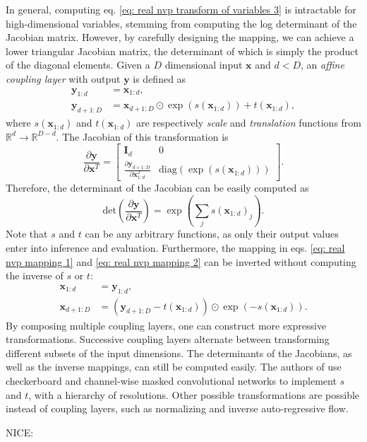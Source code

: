 In general, computing eq. \ref{eq: real nvp transform of variables 3} is intractable for high-dimensional variables, stemming from computing the log determinant of the Jacobian matrix. However, by carefully designing the mapping, we can achieve a lower triangular Jacobian matrix, the determinant of which is simply the product of the diagonal elements. Given a $D$ dimensional input $\mathbf{x}$ and $d < D$, an \textit{affine coupling layer} with output $\mathbf{y}$ is defined as 
\begin{align}
	\mathbf{y}_{1:d} &= \mathbf{x}_{1:d},
	\label{eq: real nvp mapping 1} \\
	\mathbf{y}_{d+1:D} &= \mathbf{x}_{d+1:D} \odot \exp (s(\mathbf{x}_{1:d})) + t(\mathbf{x}_{1:d}),
	\label{eq: real nvp mapping 2}
\end{align}
where $s(\mathbf{x}_{1:d})$ and $t(\mathbf{x}_{1:d})$ are respectively \textit{scale} and \textit{translation} functions from $\mathbb{R}^d \rightarrow \mathbb{R}^{D-d}$. The Jacobian of this transformation is
\begin{equation}
	\frac{\partial \mathbf{y}}{\partial \mathbf{x}^T} =
	\begin{bmatrix}
    \mathbf{I}_d & 0 \\
    \frac{\partial \mathbf{y}_{d+1:D}}{\partial \mathbf{x}^T_{1:d}}  & \text{diag} \left( \exp \left( s(\mathbf{x}_{1:d}) \right) \right)
\end{bmatrix}.
\end{equation}
Therefore, the determinant of the Jacobian can be easily computed as
\begin{equation}
	\text{det} \left( \frac{\partial \mathbf{y}}{\partial \mathbf{x}^T}  \right) = \exp \left( \sum_j s(\mathbf{x}_{1:d})_j \right).
\end{equation}
Note that $s$ and $t$ can be any arbitrary functions, as only their output values enter into inference and evaluation. Furthermore, the mapping in eqs. \ref{eq: real nvp mapping 1} and \ref{eq: real nvp mapping 2} can be inverted without computing the inverse of $s$ or $t$:
\begin{align}
	\mathbf{x}_{1:d} &= \mathbf{y}_{1:d}, \\
	\mathbf{x}_{d+1:D} &= (\mathbf{y}_{d+1:D} - t(\mathbf{x}_{1:d})) \odot \exp (- s(\mathbf{x}_{1:d})).
\end{align}
By composing multiple coupling layers, one can construct more expressive transformations. Successive coupling layers alternate between transforming different subsets of the input dimensions. The determinants of the Jacobians, as well as the inverse mappings, can still be computed easily. The authors of \cite{dinh2016density} use checkerboard and channel-wise masked convolutional networks to implement $s$ and $t$, with a hierarchy of resolutions. Other possible transformations are possible instead of coupling layers, such as normalizing and inverse auto-regressive flow.

NICE: \cite{dinh2014nice}







